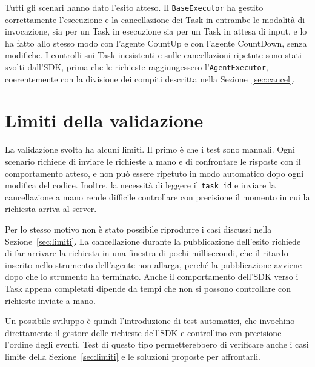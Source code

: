Tutti gli scenari hanno dato l'esito atteso. Il \texttt{BaseExecutor} ha gestito correttamente l'esecuzione e la cancellazione dei Task in entrambe le modalità di invocazione, sia per un Task in esecuzione sia per un Task in attesa di input, e lo ha fatto allo stesso modo con l'agente CountUp e con l'agente CountDown, senza modifiche. I controlli sui Task inesistenti e sulle cancellazioni ripetute sono stati svolti dall'SDK, prima che le richieste raggiungessero l'\texttt{AgentExecutor}, coerentemente con la divisione dei compiti descritta nella Sezione~\ref{sec:cancel}.

\section{Limiti della validazione}
\label{sec:limiti-validazione}

La validazione svolta ha alcuni limiti. Il primo è che i test sono manuali. Ogni scenario richiede di inviare le richieste a mano e di confrontare le risposte con il comportamento atteso, e non può essere ripetuto in modo automatico dopo ogni modifica del codice. Inoltre, la necessità di leggere il \texttt{task\_id} e inviare la cancellazione a mano rende difficile controllare con precisione il momento in cui la richiesta arriva al server.

Per lo stesso motivo non è stato possibile riprodurre i casi discussi nella Sezione~\ref{sec:limiti}. La cancellazione durante la pubblicazione dell'esito richiede di far arrivare la richiesta in una finestra di pochi millisecondi, che il ritardo inserito nello strumento dell'agente non allarga, perché la pubblicazione avviene dopo che lo strumento ha terminato. Anche il comportamento dell'SDK verso i Task appena completati dipende da tempi che non si possono controllare con richieste inviate a mano.

Un possibile sviluppo è quindi l'introduzione di test automatici, che invochino direttamente il gestore delle richieste dell'SDK e controllino con precisione l'ordine degli eventi. Test di questo tipo permetterebbero di verificare anche i casi limite della Sezione~\ref{sec:limiti} e le soluzioni proposte per affrontarli.

